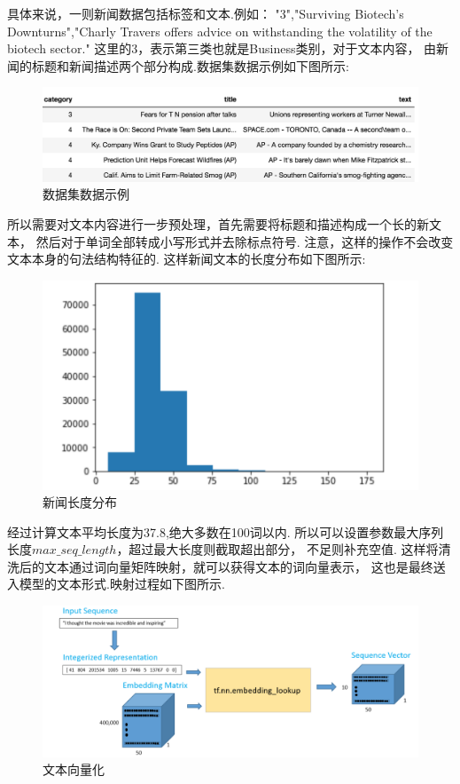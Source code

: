 \documentclass[bachelor,winfonts]{jnuthesis}
\begin{document}
具体来说，一则新闻数据包括标签和文本.例如：
"3","Surviving Biotech's Downturns","Charly Travers offers advice on withstanding the volatility of the biotech sector."
这里的3，表示第三类也就是Business类别，对于文本内容，
由新闻的标题和新闻描述两个部分构成.数据集数据示例如下图所示:

\begin{figure}[h!]
  \centering
  \includegraphics[width=0.8\linewidth]{数据示例.png}
  \caption{数据集数据示例}
\end{figure}


所以需要对文本内容进行一步预处理，首先需要将标题和描述构成一个长的新文本，
然后对于单词全部转成小写形式并去除标点符号.
注意，这样的操作不会改变文本本身的句法结构特征的.
这样新闻文本的长度分布如下图所示:

\begin{figure}[h!]
  \centering
  \includegraphics[width=0.6\linewidth]{长度分布.png}
  \caption{新闻长度分布}
\end{figure}

经过计算文本平均长度为37.8,绝大多数在100词以内.
所以可以设置参数最大序列长度$max\_seq\_length$，超过最大长度则截取超出部分，
不足则补充空值.
这样将清洗后的文本通过词向量矩阵映射，就可以获得文本的词向量表示，
这也是最终送入模型的文本形式.映射过程如下图所示.

\begin{figure}[h!]
  \centering
  \includegraphics[width=0.95\linewidth]{词向量映射.png}
  \caption{文本向量化}
\end{figure}
\end{document}
